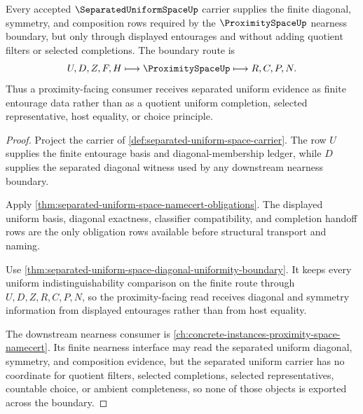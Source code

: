 \begin{theorem}
\label{thm:separated-uniform-space-proximity-boundary}
Every accepted $\SeparatedUniformSpaceUp$ carrier supplies the finite diagonal, symmetry, and composition rows required by the $\ProximitySpaceUp$ nearness boundary, but only through displayed entourages and without adding quotient filters or selected completions. The boundary route is
$$
U,D,Z,F,H \longmapsto \ProximitySpaceUp \longmapsto R,C,P,N .
$$
Thus a proximity-facing consumer receives separated uniform evidence as finite entourage data rather than as a quotient uniform completion, selected representative, host equality, or choice principle.
\end{theorem}
\begin{proof}
Project the carrier of \autoref{def:separated-uniform-space-carrier}. The row $U$ supplies the finite entourage basis and diagonal-membership ledger, while $D$ supplies the separated diagonal witness used by any downstream nearness boundary.

Apply \autoref{thm:separated-uniform-space-namecert-obligations}. The displayed uniform basis, diagonal exactness, classifier compatibility, and completion handoff rows are the only obligation rows available before structural transport and naming.

Use \autoref{thm:separated-uniform-space-diagonal-uniformity-boundary}. It keeps every uniform indistinguishability comparison on the finite route through $U,D,Z,R,C,P,N$, so the proximity-facing read receives diagonal and symmetry information from displayed entourages rather than from host equality.

The downstream nearness consumer is \autoref{ch:concrete-instances-proximity-space-namecert}. Its finite nearness interface may read the separated uniform diagonal, symmetry, and composition evidence, but the separated uniform carrier has no coordinate for quotient filters, selected completions, selected representatives, countable choice, or ambient completeness, so none of those objects is exported across the boundary.
\end{proof}

